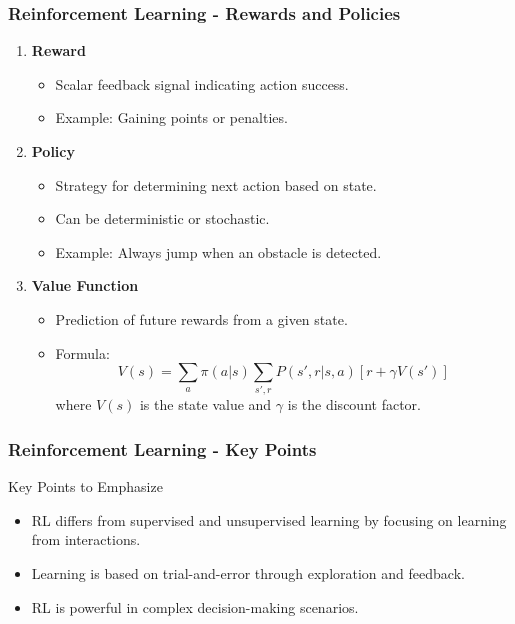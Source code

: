 \documentclass{beamer}
\begin{document}
\begin{frame}[fragile]
    \frametitle{Reinforcement Learning - Rewards and Policies}
    \begin{enumerate}[resume]
        \item \textbf{Reward}
            \begin{itemize}
                \item Scalar feedback signal indicating action success.
                \item Example: Gaining points or penalties.
            \end{itemize}

        \item \textbf{Policy}
            \begin{itemize}
                \item Strategy for determining next action based on state.
                \item Can be deterministic or stochastic.
                \item Example: Always jump when an obstacle is detected.
            \end{itemize}

        \item \textbf{Value Function}
            \begin{itemize}
                \item Prediction of future rewards from a given state.
                \item Formula: 
                \[
                    V(s) = \sum_{a} \pi(a|s) \sum_{s',r} P(s',r|s,a) [r + \gamma V(s')]
                \]
                where $V(s)$ is the state value and $\gamma$ is the discount factor.
            \end{itemize}
    \end{enumerate}
\end{frame}

\begin{frame}[fragile]
    \frametitle{Reinforcement Learning - Key Points}
    \begin{block}{Key Points to Emphasize}
        \begin{itemize}
            \item RL differs from supervised and unsupervised learning by focusing on learning from interactions.
            \item Learning is based on trial-and-error through exploration and feedback.
            \item RL is powerful in complex decision-making scenarios.
        \end{itemize}
    \end{block}
\end{frame}
\end{document}
